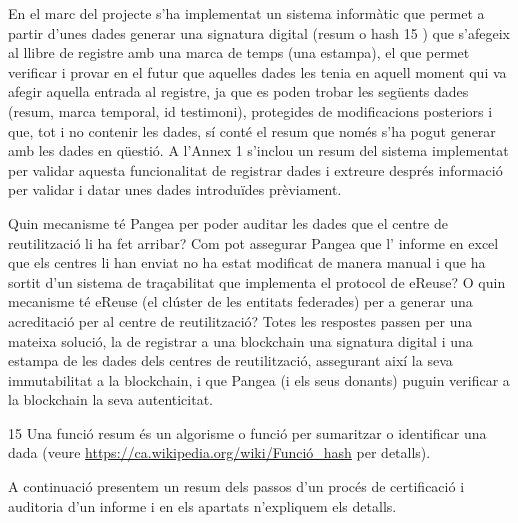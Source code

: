 \documentclass[
]{book}
\begin{document}
En el marc del projecte s'ha implementat un sistema informàtic que permet a partir d'unes dades generar una signatura digital (resum o hash 15 ) que s'afegeix al llibre de registre amb una marca de temps (una estampa), el que permet verificar i provar en el futur que aquelles dades les tenia en aquell moment qui va afegir aquella entrada al registre, ja que es poden trobar les següents dades (resum, marca temporal, id testimoni), protegides de modificacions posteriors i que, tot i no contenir les dades, sí conté el resum que només s'ha pogut generar amb les dades en qüestió. A l'Annex 1 s'inclou un resum del sistema implementat per validar aquesta funcionalitat de registrar dades i extreure després informació per validar i datar unes dades introduïdes prèviament.

Quin mecanisme té Pangea per poder auditar les dades que el centre de reutilització li ha fet arribar? Com pot assegurar Pangea que l' informe en excel que els centres li han enviat no ha estat modificat de manera manual i que ha sortit d'un sistema de traçabilitat que implementa el protocol de eReuse? O quin mecanisme té eReuse (el clúster de les entitats federades) per a generar una acreditació per al centre de reutilització? Totes les respostes passen per una mateixa solució, la de registrar a una blockchain una signatura digital i una estampa de les dades dels centres de reutilització, assegurant així la seva immutabilitat a la blockchain, i que Pangea (i els seus donants) puguin verificar a la blockchain la seva autenticitat.

15 Una funció resum és un algorisme o funció per sumaritzar o identificar una dada (veure \url{https://ca.wikipedia.org/wiki/Funció_hash} per detalls).

A continuació presentem un resum dels passos d'un procés de certificació i auditoria d'un informe i en els apartats n'expliquem els detalls.
\end{document}
